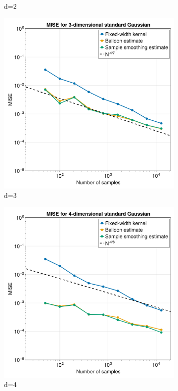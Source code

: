\documentclass{article}
\begin{document}
\begin{figure}
\begin{subfigure}{.5\textwidth}
  \caption{d=2}
  \label{fig:MISE-2}
\end{subfigure}
\begin{subfigure}{.5\textwidth}
  \centering
  \includegraphics[width=.8\linewidth]{images/updated_k_MISE_d=3.png}
  \caption{d=3}
  \label{fig:MISE-3}
\end{subfigure}%
\begin{subfigure}{.5\textwidth}
  \centering
  \includegraphics[width=.8\linewidth]{images/updated_k_MISE_d=4.png}
  \caption{d=4}
  \label{fig:MISE-4}
\end{subfigure}
\begin{subfigure}{.5\textwidth}

\end{subfigure}
\end{figure}
\end{document}
